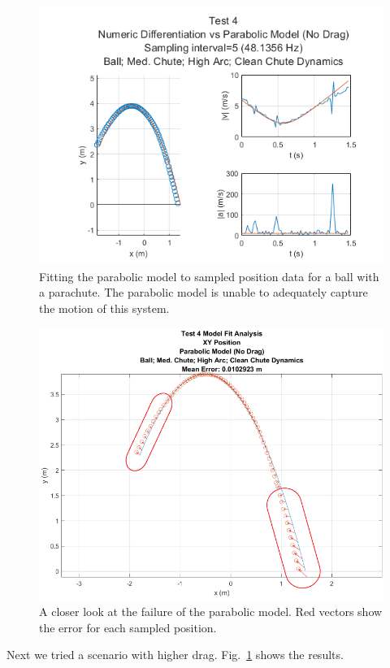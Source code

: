 
\begin{figure}[t]
\centering
\includegraphics[width=0.9\linewidth]{images/Analysis1_Test4_Fig5_NoDrag.png}
\caption{\label{fig:Analysis1_Test4_Fig5_NoDrag} Fitting the parabolic model to sampled position data for a ball with a parachute. The parabolic model is unable to adequately capture the motion of this system.}
\end{figure}

\begin{figure}[t]
\centering
\includegraphics[width=0.9\linewidth]{images/Analysis1_Test4_Err_NoDrag.png}
\caption{\label{fig:Analysis1_Test4_Err_NoDrag} A closer look at the failure of the parabolic model. Red vectors show the error for each sampled position.}
\end{figure}

Next we tried a scenario with higher drag. Fig.~\ref{fig:Analysis1_Test4_Fig5_NoDrag} shows the results. 